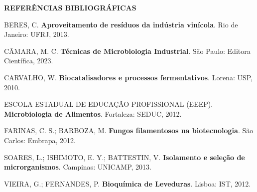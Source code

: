 %

\clearpage
{}
\vspace{1\baselineskip}
{\centering\bfseries REFERÊNCIAS BIBLIOGRÁFICAS\par}
\begingroup
\vspace{-0.5\baselineskip}
\singlespacing
\setlength{\parskip}{\baselineskip}
\setlength{\parindent}{0pt}

BERES, C. \textbf{Aproveitamento de resíduos da indústria vinícola}. Rio de Janeiro: UFRJ, 2013.

CÂMARA, M. C. \textbf{Técnicas de Microbiologia Industrial}. São Paulo: Editora Científica, 2023.

CARVALHO, W. \textbf{Biocatalisadores e processos fermentativos}. Lorena: USP, 2010.

ESCOLA ESTADUAL DE EDUCAÇÃO PROFISSIONAL (EEEP). \textbf{Microbiologia de Alimentos}. Fortaleza: SEDUC, 2012.

FARINAS, C. S.; BARBOZA, M. \textbf{Fungos filamentosos na biotecnologia}. São Carlos: Embrapa, 2012.

SOARES, L.; ISHIMOTO, E. Y.; BATTESTIN, V. \textbf{Isolamento e seleção de microrganismos}. Campinas: UNICAMP, 2013.

VIEIRA, G.; FERNANDES, P. \textbf{Bioquímica de Leveduras}. Lisboa: IST, 2012.
\endgroup